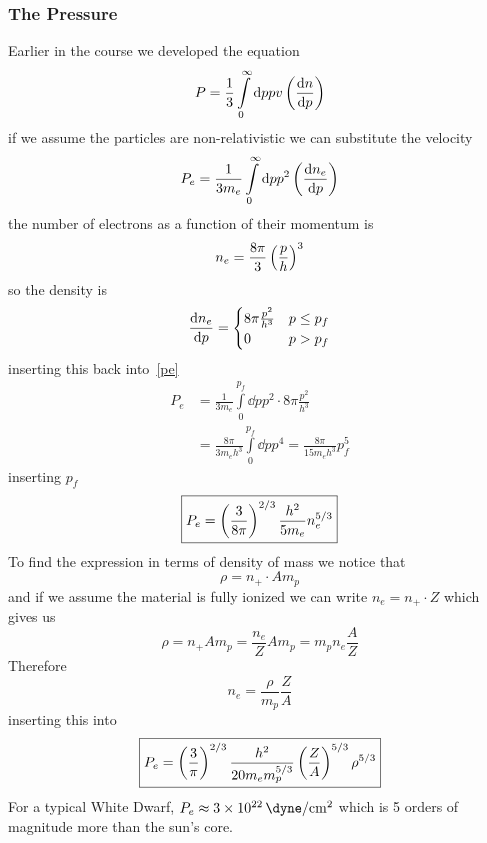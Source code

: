 \subsubsection{The Pressure}
Earlier in the course we developed the equation
\begin{equation}\label{p_pre_assumption}
    P = \frac{1}{3}\int\limits_0^\infty \dd p pv\ins{\diff{n}{p}}
\end{equation}
if we assume the particles are non-relativistic we can substitute the velocity
\begin{equation}\label{pe}
    P_e = \frac{1}{3m_e}\int\limits_0^\infty \dd p p^2 \ins{\diff{n_e}{p}}
\end{equation}
the number of electrons as a function of their momentum is
\begin{equation}
    n_e = \frac{8\pi}{3}\left(\frac{p}{h}\right)^3
\end{equation}
so the density is
\begin{equation}
    \diff{n_e}{p} = \begin{cases}
        8\pi\frac{p^2}{h^3} & p \leq p_f \\
        0 & p > p_f
    \end{cases}
\end{equation}
inserting this back into~\ref{pe}
\begin{align}\label{pe2}
    P_e &= \frac{1}{3m_e}\int\limits_0^{p_f}\dd p p^2\cdot 8\pi\frac{p^2}{h^3}\\
    &= \frac{8\pi}{3m_e h^3}\int\limits_0^{p_f}\dd p p^4 = \frac{8\pi}{15m_e h^3}p_f^5
\end{align}
inserting \(p_f\)
\begin{equation}
    \boxed{P_e = \left(\frac{3}{8\pi}\right)^{2/3}\frac{h^2}{5m_e}n_e^{5/3}}
\end{equation}
To find the expression in terms of density of mass we notice that
\begin{equation}
    \rho = n_+ \cdot Am_p
\end{equation}
and if we assume the material is fully ionized we can write \(n_e = n_+ \cdot Z\) which gives us
\begin{equation}
    \rho = n_+ Am_p = \frac{n_e}{Z}Am_p = m_p n_e \frac{A}{Z}
\end{equation}
Therefore
\begin{equation}
    \boxed{n_e = \frac{\rho}{m_p}\frac{Z}{A}}
\end{equation}
inserting this into 
\begin{equation}
    \boxed{P_e = \left(\frac{3}{\pi}\right)^{2/3}\frac{h^2}{20m_e m_p^{5/3}}\left(\frac{Z}{A}\right)^{5/3}\rho^{5/3}}
\end{equation}
For a typical White Dwarf, \(P_e \approx \qty{3e22}{\dyne\per\centi\meter^2}\) which is 5 orders of magnitude more than the sun's core.
